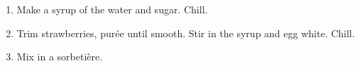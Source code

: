 
\begin{ingredients}
\end{ingredients}


\begin{recipe}
  \begin{enumerate}

  \item Make a syrup of the water and sugar.  Chill.

  \item Trim strawberries, pur\'ee until smooth.  Stir in the syrup
    and egg white.  Chill.

  \item Mix in a sorbeti\`ere.

  \end{enumerate}
\end{recipe}
